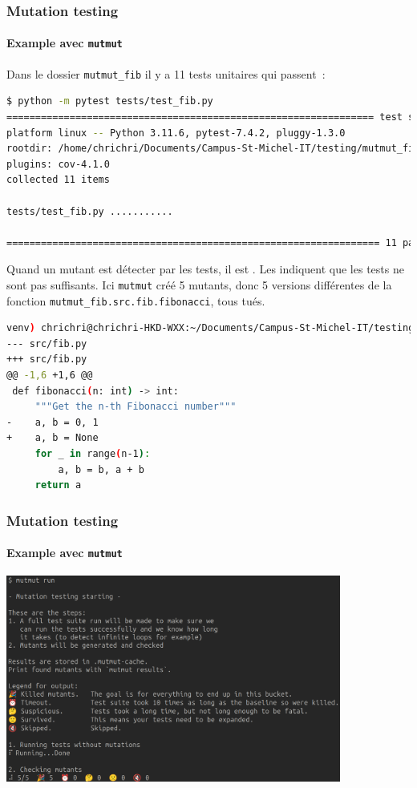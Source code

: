 \documentclass{beamer}
\begin{document}
    \begin{frame}[fragile]
        \frametitle{Mutation testing}
        \framesubtitle{Example avec \lstinline{mutmut}}
        \transdissolve
        Dans le dossier \lstinline{mutmut_fib} il y a 11 tests unitaires qui passent~:
        \begin{lstlisting}[language=bash,basicstyle=\ttfamily\tiny]
$ python -m pytest tests/test_fib.py
================================================================ test session starts ======
platform linux -- Python 3.11.6, pytest-7.4.2, pluggy-1.3.0
rootdir: /home/chrichri/Documents/Campus-St-Michel-IT/testing/mutmut_fib
plugins: cov-4.1.0
collected 11 items

tests/test_fib.py ...........                                                                                                                  [100%]

================================================================= 11 passed in 0.04s ======
        \end{lstlisting}
        Quand un mutant est détecter par les tests, il est .
        Les  indiquent que les tests ne sont pas suffisants.
        Ici \lstinline{mutmut} créé 5 mutants, donc 5 versions différentes de la fonction \lstinline{mutmut_fib.src.fib.fibonacci}, tous tués.
        \begin{lstlisting}[language=bash,basicstyle=\ttfamily\tiny]
venv) chrichri@chrichri-HKD-WXX:~/Documents/Campus-St-Michel-IT/testing/mutmut$ mutmut show 3
--- src/fib.py
+++ src/fib.py
@@ -1,6 +1,6 @@
 def fibonacci(n: int) -> int:
     """Get the n-th Fibonacci number"""
-    a, b = 0, 1
+    a, b = None
     for _ in range(n-1):
         a, b = b, a + b
     return a
        \end{lstlisting}
    \end{frame}

    \begin{frame}
        \frametitle{Mutation testing}
        \framesubtitle{Example avec \lstinline{mutmut}}
        \transdissolve
        \centering
        \includegraphics[width=11cm]{image/mutmut-result}
    \end{frame}
\end{document}
